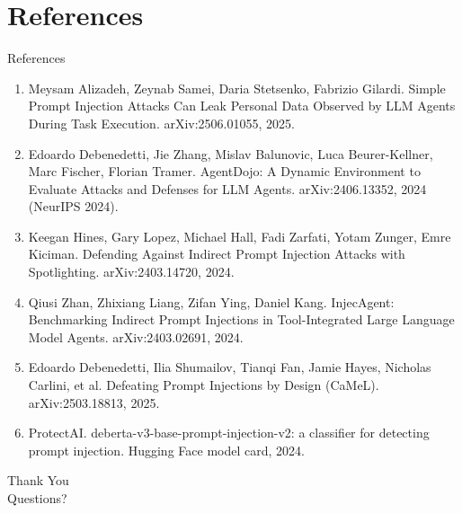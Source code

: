 \documentclass[10pt]{beamer}
\begin{document}
\section{References}
\begin{frame}[allowframebreaks]{References}
  \footnotesize
  \begin{enumerate}
    \item Meysam Alizadeh, Zeynab Samei, Daria Stetsenko, Fabrizio Gilardi. Simple Prompt Injection Attacks Can Leak Personal Data Observed by LLM Agents During Task Execution. arXiv:2506.01055, 2025.
    \item Edoardo Debenedetti, Jie Zhang, Mislav Balunovic, Luca Beurer-Kellner, Marc Fischer, Florian Tramer. AgentDojo: A Dynamic Environment to Evaluate Attacks and Defenses for LLM Agents. arXiv:2406.13352, 2024 (NeurIPS 2024).
    \item Keegan Hines, Gary Lopez, Michael Hall, Fadi Zarfati, Yotam Zunger, Emre Kiciman. Defending Against Indirect Prompt Injection Attacks with Spotlighting. arXiv:2403.14720, 2024.
    \item Qiusi Zhan, Zhixiang Liang, Zifan Ying, Daniel Kang. InjecAgent: Benchmarking Indirect Prompt Injections in Tool-Integrated Large Language Model Agents. arXiv:2403.02691, 2024.
    \item Edoardo Debenedetti, Ilia Shumailov, Tianqi Fan, Jamie Hayes, Nicholas Carlini, et al. Defeating Prompt Injections by Design (CaMeL). arXiv:2503.18813, 2025.
    \item ProtectAI. deberta-v3-base-prompt-injection-v2: a classifier for detecting prompt injection. Hugging Face model card, 2024.
  \end{enumerate}
\end{frame}
\begin{frame}[plain]
  \begin{center}
    {\Huge Thank You}\\[1em]
    {\large Questions?}
  \end{center}
\end{frame}
\end{document}
